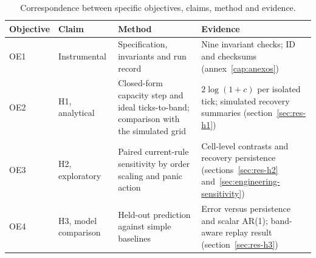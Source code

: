 \begin{table}[H]
\centering
\caption{Correspondence between specific objectives, claims, method and evidence.}
\label{tab:oe-h}
\footnotesize
\setlength{\tabcolsep}{3pt}
\renewcommand{\arraystretch}{1.0}
\begin{tabularx}{\textwidth}{@{}l l >{\raggedright\arraybackslash}X >{\raggedright\arraybackslash}X@{}}
\toprule
Objective & Claim & Method & Evidence \\
\midrule
OE1 & Instrumental & Specification, invariants and run record & Nine invariant checks; ID and checksums (annex~\ref{cap:anexos}) \\
OE2 & H1, analytical & Closed-form capacity step and ideal ticks-to-band; comparison with the simulated grid & $2\log(1+c)$ per isolated tick; simulated recovery summaries (section~\ref{sec:res-h1}) \\
OE3 & H2, exploratory & Paired current-rule sensitivity by order scaling and panic action & Cell-level contrasts and recovery persistence (sections~\ref{sec:res-h2} and~\ref{sec:engineering-sensitivity}) \\
OE4 & H3, model comparison & Held-out prediction against simple baselines & Error versus persistence and scalar AR(1); band-aware replay result (section~\ref{sec:res-h3}) \\
\bottomrule
\end{tabularx}
\end{table}
